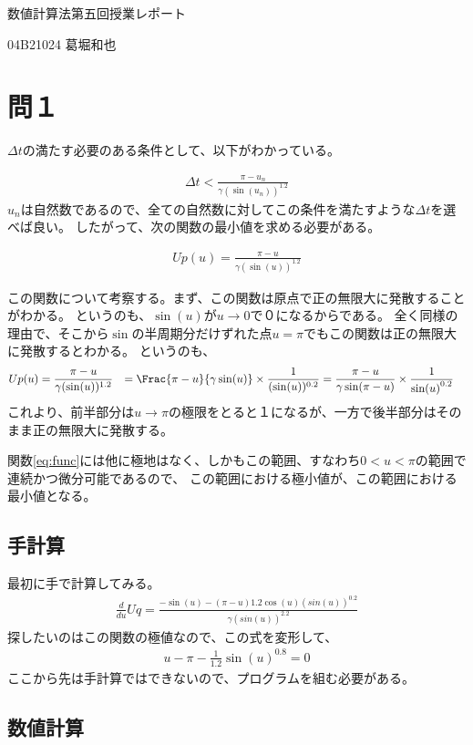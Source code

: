 \documentclass{ltjsarticle}
\begin{document}
\Huge
    数値計算法第五回授業レポート

    04B21024
    葛堀和也
\clearpage

\section{問１}
$\Delta t$の満たす必要のある条件として、以下がわかっている。

\begin{align}
    \Delta t < \frac{\pi - u_{n}}{\gamma (\sin(u_{n}))^{1.2}}
    \label{eq:base}
\end{align}
$u_{n}$は自然数であるので、全ての自然数に対してこの条件を満たすような$\Delta t$を選べば良い。
したがって、次の関数の最小値を求める必要がある。

\begin{align}
    Up(u) = \frac{\pi - u}{\gamma (\sin(u))^{1.2}}
    \label{eq:cfunc}
\end{align}


この関数について考察する。まず、この関数は原点で正の無限大に発散することがわかる。
というのも、$\sin(u)$が$u \rightarrow 0$で０になるからである。
全く同様の理由で、そこから$\sin$の半周期分だけずれた点$u=\pi$でもこの関数は正の無限大に発散するとわかる。
というのも、
\begin{align}
    Up(u) &= \frac{\pi - u}{\gamma (\sin(u))^{1.2}}
          &= \Frac{\pi - u}{\gamma \sin(u)}  \times \frac{1}{(\sin(u))^{0.2}}
          &= \frac{\pi - u}{\gamma \sin(\pi -u)} \times \frac{1}{\sin(u)^{0.2}}
\end{align}
これより、前半部分は$u \rightarrow \pi$の極限をとると１になるが、一方で後半部分はそのまま正の無限大に発散する。

関数\ref{eq:func}には他に極地はなく、しかもこの範囲、すなわち$0<u<\pi$の範囲で連続かつ微分可能であるので、
この範囲における極小値が、この範囲における最小値となる。

\subsection{手計算}
最初に手で計算してみる。
\begin{align}
    \frac{d}{du}Uq = \frac{-\sin(u) - (\pi -u )1.2 \cos(u)(sin(u))^{0.2}}{\gamma (sin(u))^{2.2}}
\end{align}
探したいのはこの関数の極値なので、この式を変形して、
\begin{align}
    u-\pi -\frac{1}{1.2}\sin(u)^{0.8}=0
\end{align}
ここから先は手計算ではできないので、プログラムを組む必要がある。


\subsection{数値計算}
\end{document}
